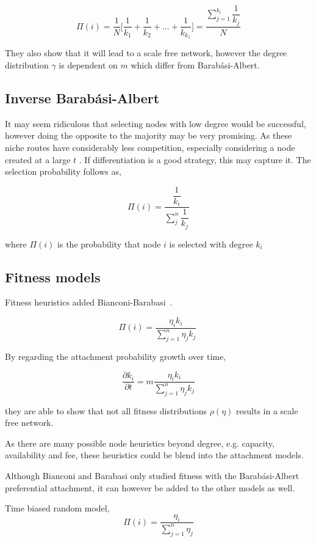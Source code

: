 \[ \Pi(i) = \dfrac{1}{N} \bigg\lbrack \dfrac{1}{k_1} + \dfrac{1}{k_2} + ... + \dfrac{1}{k_{k_1}} \bigg\rbrack = \dfrac{\sum_{j=1}^{k_i}\dfrac{1}{k_j}}{N} \]

They also show that it will lead to a scale free network, however the \gls{degree distribution} $\gamma$ is dependent on $m$ which differ from Barabási-Albert.

\subsection{Inverse Barabási-Albert}


It may seem ridiculous that selecting nodes with low degree would be successful, however doing the opposite to the majority may be very promising. As these niche routes have considerably less competition, especially considering a node created at a large $t$ . If differentiation is a good strategy, this may capture it. The selection probability follows as, 

\[ \Pi(i) =  \dfrac{\dfrac{1}{k_i}}{\sum_{j}^{n} \dfrac{1}{k_j}} \]

where $\Pi(i)$ is the probability that node $i$ is selected with degree $k_i$

\subsection{Fitness models}

Fitness heuristics added Bianconi-Barabasi~\cite{bianconi:barabasi:fitness:network}.

\[ \Pi(i) = \dfrac{\eta_ik_i}{\sum_{j=1}^{n}\eta_jk_j}\ \]

By regarding the attachment probability growth over time,

\[ \dfrac{\partial k_i}{\partial t} = m \dfrac{\eta_ik_i}{\sum_{j=1}^{n}\eta_jk_j} \]

they are able to show that not all fitness distributions $\rho(\eta)$ results in a scale free network.

As there are many possible node heuristics beyond degree, e.g. capacity, availability and fee, these heuristics could be blend into the attachment models. 

Although Bianconi and Barabasi only studied fitness with the Barabási-Albert preferential attachment, it can however be added to the other models as well.

Time biased random model,
~
\[ \Pi(i) = \dfrac{\eta_i}{\sum_{j=1}^{n} \eta_j} \]

